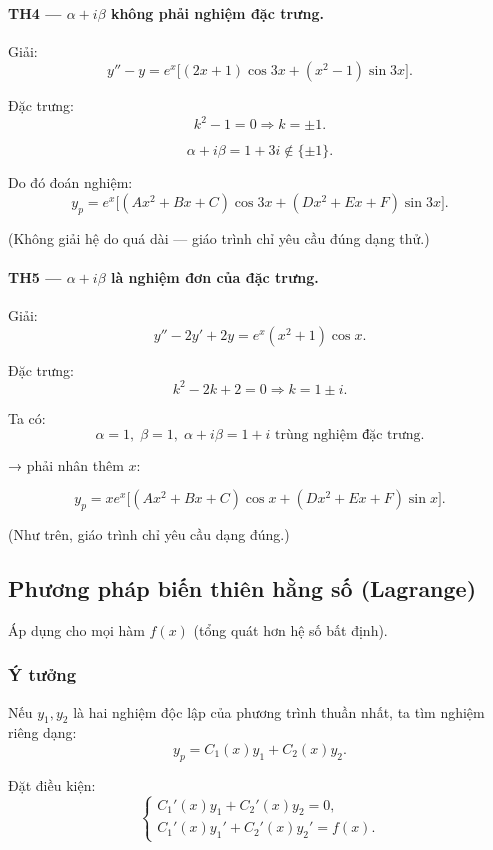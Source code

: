 \documentclass[12pt,a4paper]{article}
\begin{document}
\paragraph{TH4 — $\alpha+i\beta$ không phải nghiệm đặc trưng.}

Giải:
\[
y'' - y = e^{x}\big[(2x+1)\cos 3x + (x^2 - 1)\sin 3x\big].
\]

Đặc trưng:
\[
k^2 - 1 = 0 \Rightarrow k=\pm 1.
\]

\[
\alpha + i\beta = 1 + 3i \notin\{\pm 1\}.
\]

Do đó đoán nghiệm:
\[
y_p = e^{x}\big[(Ax^2+Bx+C)\cos 3x + (Dx^2+Ex+F)\sin 3x\big].
\]

(Không giải hệ do quá dài — giáo trình chỉ yêu cầu đúng dạng thử.)

\bigskip

\paragraph{TH5 — $\alpha+i\beta$ là nghiệm đơn của đặc trưng.}

Giải:
\[
y'' - 2y' + 2y = e^{x}(x^2 + 1)\cos x.
\]

Đặc trưng:
\[
k^2 - 2k + 2=0 \Rightarrow k = 1 \pm i.
\]

Ta có:
\[
\alpha=1,\; \beta=1,\; \alpha+i\beta = 1+i \text{ trùng nghiệm đặc trưng}.
\]

→ phải nhân thêm $x$:

\[
y_p = x e^{x}\big[(Ax^2+Bx+C)\cos x + (Dx^2+Ex+F)\sin x\big].
\]

(Như trên, giáo trình chỉ yêu cầu dạng đúng.)

\bigskip

\subsection{Phương pháp biến thiên hằng số (Lagrange)}

Áp dụng cho mọi hàm $f(x)$ (tổng quát hơn hệ số bất định).

\subsubsection*{Ý tưởng}
Nếu $y_1, y_2$ là hai nghiệm độc lập của phương trình thuần nhất, ta tìm nghiệm riêng dạng:
\[
y_p = C_1(x) y_1 + C_2(x) y_2.
\]

Đặt điều kiện:
\[
\begin{cases}
C_1'(x) y_1 + C_2'(x) y_2 = 0,\\
C_1'(x) y_1' + C_2'(x) y_2' = f(x).
\end{cases}
\]
\end{document}
